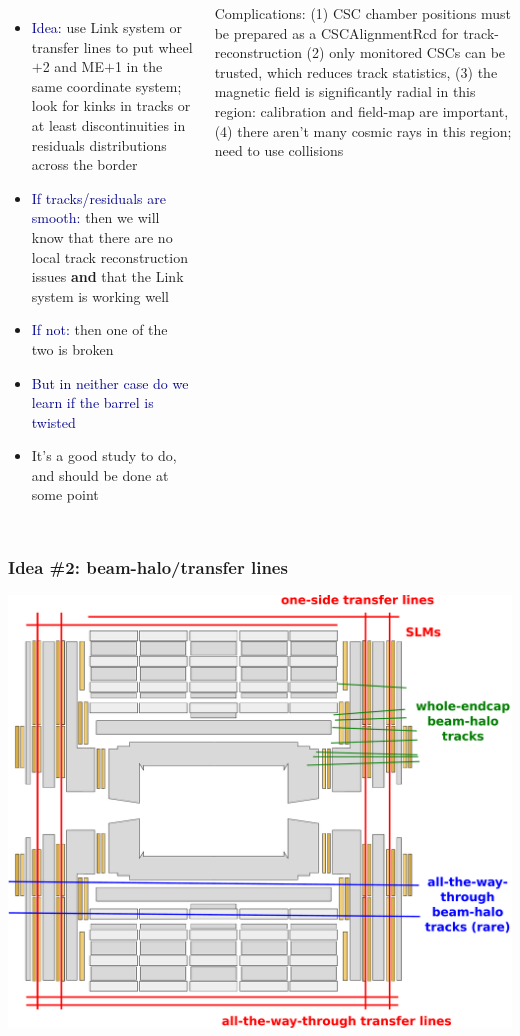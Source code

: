 \documentclass[compress]{beamer}
\begin{document}
\begin{frame}
\begin{columns}
\begin{itemize}
\item \textcolor{darkblue}{Idea:} use Link system or transfer lines to
  put wheel $+$2 and ME$+$1 in the same coordinate system; look for kinks in
  tracks or at least discontinuities in residuals distributions across
  the border

\item \textcolor{darkblue}{If tracks/residuals are smooth:} then we
  will know that there are no local track reconstruction issues {\bf and}
  that the Link system is working well

\item \textcolor{darkblue}{If not:} then one of the two is broken

\item \textcolor{darkblue}{But in neither case do we learn if the
  barrel is twisted}

\item It's a good study to do, and should be done at some point
\end{itemize}

\begin{minipage}{\linewidth}
\tiny Complications: (1) CSC chamber positions must be prepared as a
CSCAlignmentRcd for track-reconstruction (2) only monitored CSCs can
be trusted, which reduces track statistics, (3) the magnetic field is
significantly radial in this region: calibration and field-map are
important, (4) there aren't many cosmic rays in this region; need to
use collisions
\end{minipage}
\end{columns}
\end{frame}

\begin{frame}
\frametitle{Idea \#2: beam-halo/transfer lines}
\begin{center}
\includegraphics[width=0.9\linewidth]{beamhalo_transferlines.pdf}
\end{center}
\end{frame}
\end{document}
